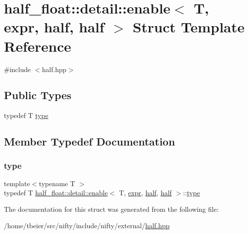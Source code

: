 \hypertarget{structhalf__float_1_1detail_1_1enable_3_01T_00_01expr_00_01half_00_01half_01_4}{}\section{half\+\_\+float\+:\+:detail\+:\+:enable$<$ T, expr, half, half $>$ Struct Template Reference}
\label{structhalf__float_1_1detail_1_1enable_3_01T_00_01expr_00_01half_00_01half_01_4}


{\ttfamily \#include $<$half.\+hpp$>$}

\subsection*{Public Types}
\begin{DoxyCompactItemize}
\item 
typedef T \hyperlink{structhalf__float_1_1detail_1_1enable_3_01T_00_01expr_00_01half_00_01half_01_4_a48d3328de918e7e975e2c2f8c22d0833}{type}
\end{DoxyCompactItemize}


\subsection{Member Typedef Documentation}
\mbox{\label{structhalf__float_1_1detail_1_1enable_3_01T_00_01expr_00_01half_00_01half_01_4_a48d3328de918e7e975e2c2f8c22d0833}} 
\subsubsection{\texorpdfstring{type}{type}}
{\footnotesize\ttfamily template$<$typename T $>$ \\
typedef T \hyperlink{structhalf__float_1_1detail_1_1enable}{half\+\_\+float\+::detail\+::enable}$<$ T, \hyperlink{structhalf__float_1_1detail_1_1expr}{expr}, \hyperlink{classhalf__float_1_1half}{half}, \hyperlink{classhalf__float_1_1half}{half} $>$\+::\hyperlink{structhalf__float_1_1detail_1_1enable_3_01T_00_01expr_00_01half_00_01half_01_4_a48d3328de918e7e975e2c2f8c22d0833}{type}}



The documentation for this struct was generated from the following file\+:\begin{DoxyCompactItemize}
\item 
/home/tbeier/src/nifty/include/nifty/external/\hyperlink{half_8hpp}{half.\+hpp}\end{DoxyCompactItemize}
